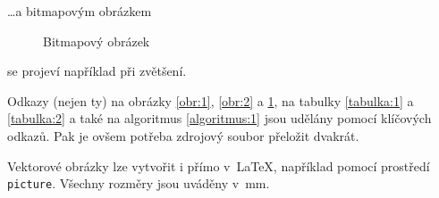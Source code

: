 \documentclass[a4paper, 11pt]{article}
\begin{document}
\noindent \dots a bitmapovým obrázkem
\begin{figure}[htb]
  \begin{center}
    \caption{Bitmapový obrázek}
    \label{obr:3}
  \end{center}
\end{figure}

\noindent se projeví například při zvětšení.

Odkazy (nejen ty) na obrázky \ref{obr:1}, \ref{obr:2} a \ref{obr:3}, na tabulky \ref{tabulka:1} a \ref{tabulka:2} a také na algoritmus \ref{algoritmus:1} jsou udělány pomocí klíčových odkazů. Pak je ovšem potřeba zdrojový soubor přeložit dvakrát.

Vektorové obrázky lze vytvořit i přímo v~\LaTeX , například pomocí prostředí \texttt{picture}. Všechny rozměry jsou uváděny v~mm.
\end{document}
